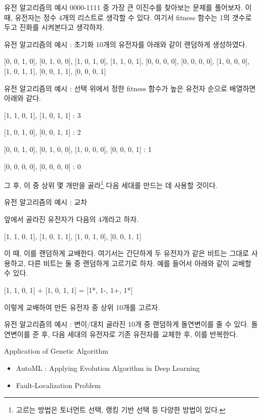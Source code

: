 \documentclass{beamer}
\begin{document}
\begin{frame}{유전 알고리즘의 예시}
0000-1111 중 가장 큰 이진수를 찾아보는 문제를 풀어보자. 이 때, 유전자는 정수 4개의 리스트로 생각할 수 있다. 여기서 fitness 함수는 1의 갯수로 두고 진화를 시켜본다고 생각하자. 
\end{frame}

\begin{frame}{유전 알고리즘의 예시 : 초기화}
10개의 유전자를 아래와 같이 랜덤하게 생성하였다. 

[0, 0, 1, 0], [0, 1, 0, 0], [1, 0, 1, 0], [1, 1, 0, 1], [0, 0, 0, 0], [0, 0, 0, 0], [1, 0, 0, 0], [1, 0, 1, 1], [0, 0, 1, 1], [0, 0, 0, 1]

\end{frame}
\begin{frame}{유전 알고리즘의 예시 : 선택}
위에서 정한 fitness 함수가 높은 유전자 순으로 배열하면 아래와 같다. 

[1, 1, 0, 1], [1, 0, 1, 1]  : 3
 
[1, 0, 1, 0], [0, 0, 1, 1] : 2

[0, 0, 1, 0], [0, 1, 0, 0], [1, 0, 0, 0], [0, 0, 0, 1] : 1

[0, 0, 0, 0], [0, 0, 0, 0] : 0

그 후, 이 중 상위 몇 개만을 골라\footnote{고르는 방법은 토너먼트 선택, 랭킹 기반 선택 등 다양한 방법이 있다.} 다음 세대를 만드는 데 사용할 것이다. 

\end{frame}
\begin{frame}{유전 알고리즘의 예시 : 교차}

앞에서 골라진 유전자가 다음의 4개라고 하자. 

[1, 1, 0, 1], [1, 0, 1, 1], [1, 0, 1, 0], [0, 0, 1, 1]

이 때, 이를 랜덤하게 교배한다. 여기서는 간단하게 두 유전자가 같은 비트는 그대로 사용하고, 다른 비트는 둘 중 랜덤하게 고르기로 하자. 예를 들어서 아래와 같이 교배할 수 있다. 

[1, 1, 0, 1] + [1, 0, 1, 1] = [1*, 1-, 1+, 1*]

이렇게 교배하여 만든 유전자 중 상위 10개를 고르자. 
\end{frame}
\begin{frame}{유전 알고리즘의 예시 : 변이/대치}
골라진 10개 중 랜덤하게 돌연변이를 줄 수 있다. 돌연변이를 준 후, 다음 세대의 유전자로 기존 유전자를 교체한 후, 이를 반복한다. 
\end{frame}


\begin{frame}{Application of Genetic Algorithm}
\begin{itemize}
\item AutoML : Applying Evolution Algorithm in Deep Learning 
\item Fault-Localization Problem 
\end{itemize}
\end{frame}
\end{document}
